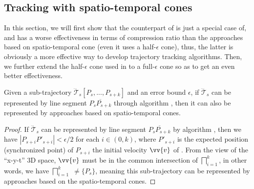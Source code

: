 

\subsection{Tracking with spatio-temporal cones}

In this section, we will first show that the counterpart of \ldrh is just a special case of, and has a worse effectiveness in terms of compression ratio than the approaches based on spatio-temporal cone (even it uses a half-$\epsilon$ cone), thus, the latter is obviously a more effective way to develop trajectory tracking algorithms. Then, we further extend the half-$\epsilon$ cone used in \cised to a full-$\epsilon$ cone so as to get an even better effectiveness.



\begin{proposition}
\label{theo-ldrh-cised}
Given a sub-trajectory $\dddot{\mathcal{T}}_s[P_s,...,P_{s+k}]$ and an error bound $\epsilon$, if $\dddot{\mathcal{T}}_s$ can be represented by line segment $\overline{P_sP_{s+k}}$ through algorithm \ldrh, then it can also be represented by approaches based on spatio-temporal cones.
\end{proposition}

\begin{proof}
If $\dddot{\mathcal{T}}_s$ can be represented by line segment $\overline{P_sP_{s+k}}$ by algorithm \ldrh, then we have $|P_{s+i}P'_{s+i}| < \epsilon/2$ for each $i \in (0, k)$, where $P'_{s+i}$ is the expected position (synchronized point) of $P_{s+i}$ \wrt the initial velocity $\vv{v}$ of \ldrh.
From the view of the ``x-y-t'' 3D space, $\vv{v}$ must be in the common intersection of  $\bigsqcap_{i=1}^{k}$, in other words, we have $\bigsqcap_{i=1}^{k}$ $\ne \{P_s\}$, meaning this sub-trajectory can be represented by approaches based on the spatio-temporal cones.
\end{proof}

